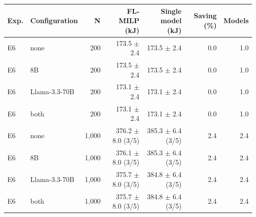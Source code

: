 \begin{tabular}{llrrrrr}
\toprule
Exp. & Configuration & N & FL-MILP (kJ) & Single model (kJ) & Saving (\%) & Models \\
\midrule
E6 & none & 200 & 173.5 $\pm$ 2.4 & 173.5 $\pm$ 2.4 & 0.0 & 1.0 \\
E6 & 8B & 200 & 173.5 $\pm$ 2.4 & 173.5 $\pm$ 2.4 & 0.0 & 1.0 \\
E6 & Llama-3.3-70B & 200 & 173.1 $\pm$ 2.4 & 173.1 $\pm$ 2.4 & 0.0 & 1.0 \\
E6 & both & 200 & 173.1 $\pm$ 2.4 & 173.1 $\pm$ 2.4 & 0.0 & 1.0 \\
E6 & none & 1,000 & 376.2 $\pm$ 8.0 (3/5) & 385.3 $\pm$ 6.4 (3/5) & 2.4 & 2.4 \\
E6 & 8B & 1,000 & 376.1 $\pm$ 8.0 (3/5) & 385.3 $\pm$ 6.4 (3/5) & 2.4 & 2.4 \\
E6 & Llama-3.3-70B & 1,000 & 375.7 $\pm$ 8.0 (3/5) & 384.8 $\pm$ 6.4 (3/5) & 2.4 & 2.4 \\
E6 & both & 1,000 & 375.7 $\pm$ 8.0 (3/5) & 384.8 $\pm$ 6.4 (3/5) & 2.4 & 2.4 \\
\bottomrule
\end{tabular}
